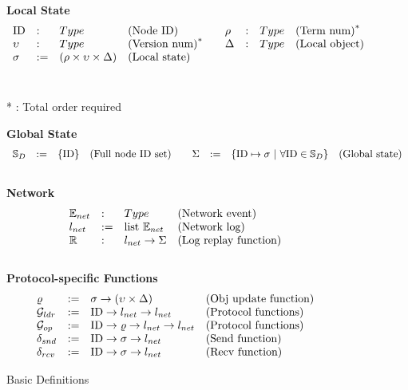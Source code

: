 \begin{figure}
\begin{small}
\raggedright

\textbf{Local State}\\
$$
\begin{array}{lllllllll}
\mathrm{ID} &:& Type & \mbox{(Node ID)} & & \rho &:& Type & \mbox{(Term num)}^* \\
\upsilon &:& Type & \mbox{(Version num)}^* & &\Delta &:& Type & \mbox{(Local object)}\\
\sigma &:=& (\rho  \times \upsilon \times \Delta) & \mbox{(Local state)} & & & & & \\
\end{array}
$$
\\
\raggedleft

* : Total order required

\raggedright
\textbf{Global State}\\
$$
\begin{array}{lllllllll}
\fullset &:=& \set{\nodeid} & \mbox{(Full node ID set)} & & \gstate &:=& \set{ \nodeid \mapsto \dstate ~\vert~ \forall \nodeid \in \fullset} & \mbox{(Global state)}\\
\end{array}
$$
\\
\textbf{Network} \\
$$
\begin{array}{llll}
\packet &: & Type & \mbox{(Network event)}\\
\networklog &:=& \mbox{list}\ \packet & \mbox{(Network log)}\\
\replay &:& \networklog \rightarrow  \gstate& \mbox{(Log replay function)}\\
\end{array}
$$
\\
\textbf{Protocol-specific Functions}  \\
$$
\begin{array}{llll}
	\updatefunc & := & \dstate \rightarrow (\seqnum \times \dsvalue) &
	\mbox{(Obj update function)} \\
\gldrfunction & := & \nodeid \rightarrow \networklog \rightarrow \networklog  & \mbox{(Protocol functions)} \\
\gopfunction & := & \nodeid \rightarrow \updatefunc \rightarrow \networklog \rightarrow \networklog  & \mbox{(Protocol functions)} \\

\sendfunction & := & \nodeid \rightarrow \dstate \rightarrow \networklog & \mbox{(Send function)}\\
\recvfunction & := & \nodeid \rightarrow \dstate \rightarrow \networklog & \mbox{(Recv function)}\\
\end{array}
$$
\end{small}
\vspace{-1em}
\caption{Basic Definitions}
\label{fig:chapter:witnesspassing:basic-state}
\vspace{-1.5em}
\end{figure}

